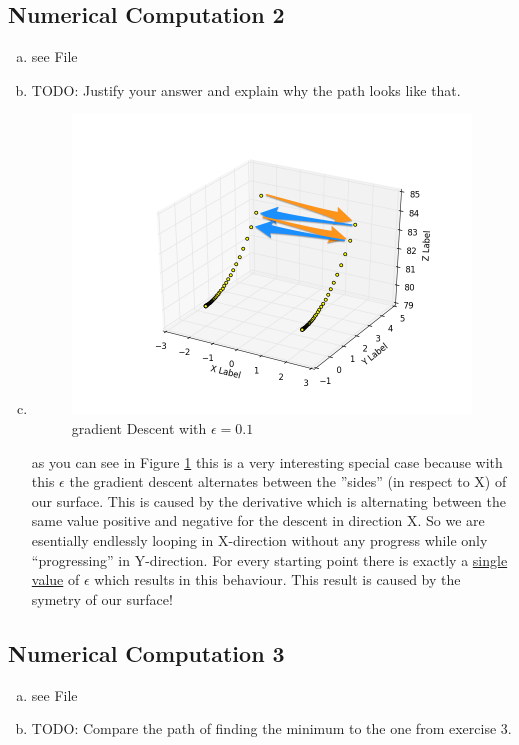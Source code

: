 \documentclass[12pt]{article}
\begin{document}
\subsection{Numerical Computation 2}
\begin{enumerate}[a)]
    \item 
        see File
    \item
        TODO: Justify your answer and explain why the path looks like that.
    \item
        \begin{figure}[H]
            \centering
            \includegraphics[width=300pt]{pictures/figure_1.png}
            \caption{gradient Descent with $\epsilon = 0.1$}
            \label{fig:fig1}
        \end{figure}
        as you can see in Figure \ref{fig:fig1} this is a very interesting special case because with this $\epsilon$ the gradient descent alternates between the ''sides'' (in respect to X) of our surface. This is caused by the derivative which is alternating between the same value positive and negative for the descent in direction X. So we are esentially endlessly looping in X-direction without any progress while only ``progressing'' in Y-direction. For every starting point there is exactly a \underline{single value} of $\epsilon$ which results in this behaviour. This result is caused by the symetry of our surface!
\end{enumerate}


\subsection{Numerical Computation 3}
\begin{enumerate}[a)]
    \item 
        see File
    \item
        TODO: Compare the path of finding the minimum to the one from exercise 3.
\end{enumerate}
\end{document}
